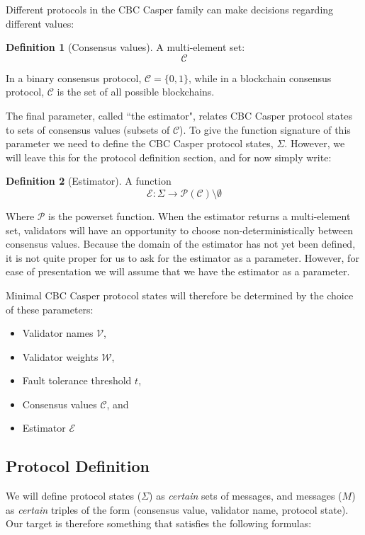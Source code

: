 \documentclass{article}
\theoremstyle{definition}
\newtheorem{defn}{Definition}[section]
\begin{document}
Different protocols in the CBC Casper family can make decisions regarding different values:

\begin{defn}[Consensus values]
A multi-element set:
$$
\mathcal{C}
$$
\end{defn}

In a binary consensus protocol, $\mathcal{C} = \{0,1\}$, while in a blockchain consensus protocol, $\mathcal{C}$ is the set of all possible blockchains.

The final parameter, called ``the estimator", relates CBC Casper protocol states to sets of consensus values (subsets of $\mathcal{C}$). To give the function signature of this parameter we need to define the CBC Casper protocol states, $\Sigma$. However, we will leave this for the protocol definition section, and for now simply write:

\begin{defn}[Estimator]
A function
$$
\mathcal{E}: \Sigma \to \mathcal{P}(\mathcal{C})\setminus\emptyset
$$
\end{defn}

Where $\mathcal{P}$ is the powerset function. When the estimator returns a multi-element set, validators will have an opportunity to choose non-deterministically between consensus values. Because the domain of the estimator has not yet been defined, it is not quite proper for us to ask for the estimator as a parameter. However, for ease of presentation we will assume that we have the estimator as a parameter.

Minimal CBC Casper protocol states will therefore be determined by the choice of these parameters:

\begin{itemize}
\item Validator names $\mathcal{V}$,
\item Validator weights $\mathcal{W}$,
\item Fault tolerance threshold $t$,
\item Consensus values $\mathcal{C}$, and
\item Estimator $\mathcal{E}$
\end{itemize}

\pagebreak
\subsection{Protocol Definition}

We will define protocol states ($\Sigma$) as \emph{certain} sets of messages, and messages ($M$) as \emph{certain} triples of the form (consensus value, validator name, protocol state). Our target is therefore something that satisfies the following formulas:
\end{document}
